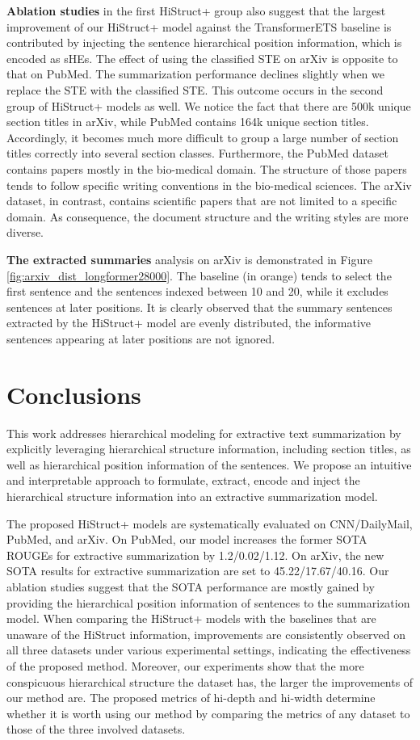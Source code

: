 \documentclass[11pt]{article}
\begin{document}
\textbf{Ablation studies} in the first HiStruct+ group also suggest that the largest improvement of our HiStruct+ model against the TransformerETS baseline is contributed by injecting the sentence hierarchical position information, which is encoded as sHEs. The effect of using the classified STE on arXiv is opposite to that on PubMed. The summarization performance declines slightly when we replace the STE with the classified STE. This outcome occurs in the second group of HiStruct+ models as well. We notice the fact that there are 500k unique section titles in arXiv, while PubMed contains 164k unique section titles. Accordingly, it becomes much more difficult to group a large number of section titles correctly into several section classes. Furthermore, the PubMed dataset contains papers mostly in the bio-medical domain. The structure of those papers tends to follow specific writing conventions in the bio-medical sciences. The arXiv dataset, in contrast, contains scientific papers that are not limited to a specific domain. As consequence, the document structure and the writing styles are more diverse.

\textbf{The extracted summaries} analysis on arXiv is demonstrated in Figure \ref{fig:arxiv_dist_longformer28000}. 
The baseline (in orange) tends to select the first sentence and the sentences indexed between 10 and 20, while it excludes sentences at later positions. It is clearly observed that the summary sentences extracted by the HiStruct+ model are evenly distributed, the informative sentences appearing at later positions are not ignored. 


\section{Conclusions}
\label{sec:Conclusions}
This work addresses hierarchical modeling for extractive text summarization by explicitly leveraging hierarchical structure information, including section titles, as well as hierarchical position information of the sentences.
We propose an intuitive and interpretable approach to formulate, extract, encode and inject the hierarchical structure information into an extractive summarization model.  

The proposed HiStruct+ models are systematically evaluated on CNN/DailyMail, PubMed, and arXiv. 
On PubMed, our model increases the former SOTA ROUGEs for extractive summarization by 1.2/0.02/1.12. On arXiv, the new SOTA results for extractive summarization are set to 45.22/17.67/40.16. Our ablation studies suggest that the SOTA performance are mostly gained by providing the hierarchical position information of sentences to the summarization model. 
When comparing the HiStruct+ models with the baselines that are unaware of the HiStruct information, improvements are consistently observed on all three datasets under various experimental settings, indicating the effectiveness of the proposed method. Moreover, our experiments show that the more conspicuous hierarchical structure the dataset has, the larger the improvements of our method are.
The proposed metrics of hi-depth and hi-width determine whether it is worth using our method by comparing the metrics of any dataset to those of the three involved datasets.
\end{document}
